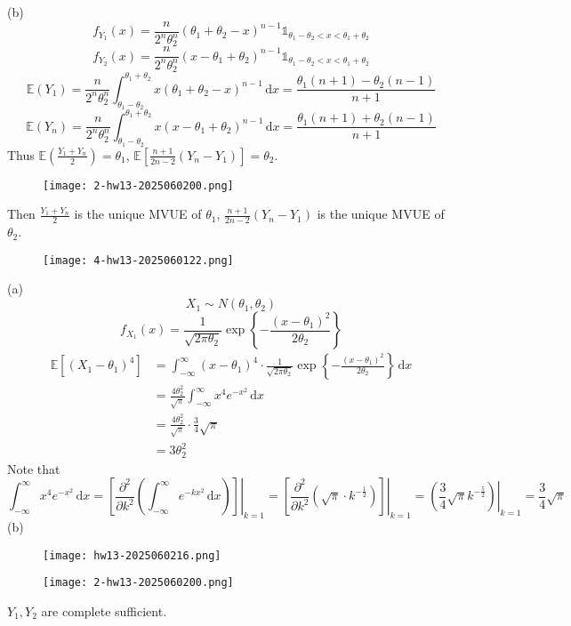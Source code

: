 (b)
\[
f_{Y_1}(x)=\frac{n}{2^{n}\theta_2^{n}}(\theta_1+\theta_2-x)^{n-1}\mathbb{1}_{\theta_1-\theta_2<x<\theta_1+\theta_2}
\]
\[
f_{Y_2}(x)=\frac{n}{2^{n}\theta_2^{n}}(x-\theta_1+\theta_2)^{n-1}\mathbb{1}_{\theta_1-\theta_2<x<\theta_1+\theta_2}
\]
\[
\mathbb{E}(Y_1)=\frac{n}{2^{n}\theta_2^{n}}\int_{\theta_1-\theta_2}^{\theta_1+\theta_2} x(\theta_1+\theta_2-x)^{n-1} \, \mathrm{d}x =\frac{\theta _1 (n+1)-\theta _2 (n-1)}{n+1}
\]
\[
\mathbb{E}(Y_n)=\frac{n}{2^{n}\theta_2^{n}}\int_{\theta_1-\theta_2}^{\theta_1+\theta_2} x(x-\theta_1+\theta_2)^{n-1} \, \mathrm{d}x=\frac{\theta _1 (n+1)+\theta _2 (n-1)}{n+1} 
\]
Thus $\mathbb{E}\left( \frac{Y_1+Y_n}{2} \right)=\theta_1$, $\mathbb{E}\left[ \frac{n+1}{2n-2}(Y_n-Y_1) \right]=\theta_2$.
\begin{figure}[H]
\centering
\texttt{[image: 2-hw13-2025060200.png]}
\label{}
\end{figure}
Then $\frac{Y_1+Y_n}{2}$ is the unique MVUE of $\theta_1$, $\frac{n+1}{2n-2}(Y_n-Y_1)$ is the unique MVUE of $\theta_2$.

\begin{exercise}
\begin{figure}[H]
\centering
\texttt{[image: 4-hw13-2025060122.png]}
\label{}
\end{figure}
\end{exercise}
(a)
\[
X_1\sim N(\theta_1,\theta_2)
\]
\[
f_{X_1}(x)=\frac{1}{\sqrt{ 2\pi\theta_2 }}\exp \left\{  -\frac{(x-\theta_1)^2}{2\theta_2}   \right\}
\]
\[
\begin{aligned}
\mathbb{E}[(X_1-\theta_1)^{4}] & =\int_{-\infty}^{\infty} (x-\theta_1)^{4}\cdot\frac{1}{\sqrt{ 2\pi\theta_2 }}\exp \left\{  -\frac{(x-\theta_1)^2}{2\theta_2}  \right\} \, \mathrm{d}x  \\
 & =\frac{4\theta_2^2}{\sqrt{ \pi }}\int_{-\infty}^{\infty} x^{4}e^{ -x^2 } \, \mathrm{d}x \\
 & = \frac{4\theta_2^2}{\sqrt{ \pi }}\cdot\frac{3}{4}\sqrt{ \pi } \\
 & =3\theta_2^2 
\end{aligned}
\]
Note that
\[
\int_{-\infty}^{\infty} x^{4}e^{ -x^2 } \, \mathrm{d}x =\left.\left[ \frac{ \partial^2   }{ \partial k ^2 }\left( \int_{-\infty}^{\infty} e^{ -kx^2 } \, \mathrm{d}x  \right) \right]\right|_{k=1}= \left.\left[ \frac{ \partial^2   }{ \partial k ^2 }\left(\sqrt{ \pi }\cdot k^{-\frac{1}{2}}\right) \right]\right|_{k=1}=\left.\left( \frac{3}{4}\sqrt{ \pi }k^{-\frac{5}{2}} \right)\right|_{k=1}=\frac{3}{4}\sqrt{ \pi }
\]
(b)
\begin{figure}[H]
\centering
\texttt{[image: hw13-2025060216.png]}
\label{}
\end{figure}
\begin{figure}[H]
\centering
\texttt{[image: 2-hw13-2025060200.png]}
\label{}
\end{figure}
$Y_1,Y_2$ are complete sufficient.

